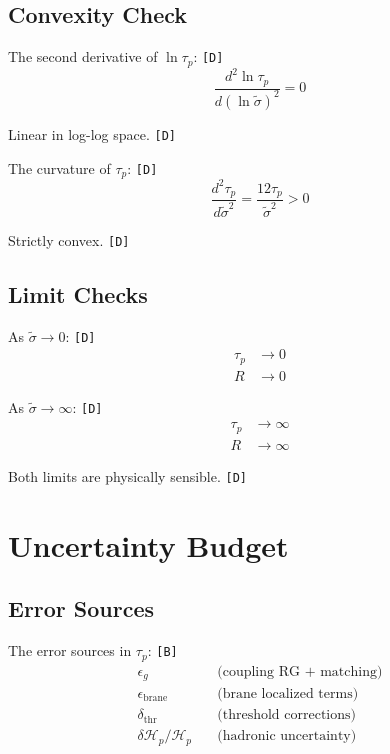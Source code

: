 \documentclass[11pt,a4paper]{article}
\newcommand{\tagD}{\textcolor{green!50!black}{\texttt{[D]}}}
\newcommand{\tagB}{\textcolor{purple!70!black}{\texttt{[B]}}}
\theoremstyle{definition}
\begin{document}
\subsection{Convexity Check}
\label{subsec:convex-check}

The second derivative of $\ln\tau_p$: \tagD{}
\begin{equation}
\label{eq:convex-1}
\frac{d^2\ln\tau_p}{d(\ln\tilde{\sigma})^2} = 0
\end{equation}

Linear in log-log space. \tagD{}

The curvature of $\tau_p$: \tagD{}
\begin{equation}
\label{eq:convex-2}
\frac{d^2\tau_p}{d\tilde{\sigma}^2} = \frac{12\tau_p}{\tilde{\sigma}^2} > 0
\end{equation}

Strictly convex. \tagD{}

\subsection{Limit Checks}
\label{subsec:limit-checks}

As $\tilde{\sigma} \to 0$: \tagD{}
\begin{align}
\label{eq:limit-small-1}
\tau_p &\to 0 \\
\label{eq:limit-small-2}
R &\to 0
\end{align}

As $\tilde{\sigma} \to \infty$: \tagD{}
\begin{align}
\label{eq:limit-large-1}
\tau_p &\to \infty \\
\label{eq:limit-large-2}
R &\to \infty
\end{align}

Both limits are physically sensible. \tagD{}

\section{Uncertainty Budget}
\label{sec:unc-budget}

\subsection{Error Sources}
\label{subsec:error-sources}

The error sources in $\tau_p$: \tagB{}
\begin{align}
\label{eq:err-src-1}
\epsilon_g &\quad \text{(coupling RG + matching)} \\
\label{eq:err-src-2}
\epsilon_{\text{brane}} &\quad \text{(brane localized terms)} \\
\label{eq:err-src-3}
\delta_{\text{thr}} &\quad \text{(threshold corrections)} \\
\label{eq:err-src-4}
\delta\mathcal{H}_p/\mathcal{H}_p &\quad \text{(hadronic uncertainty)}
\end{align}
\end{document}
